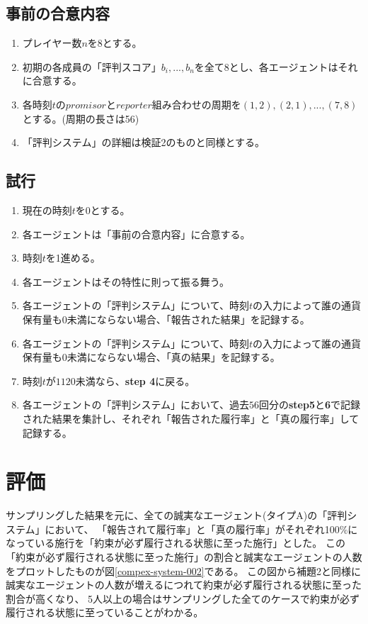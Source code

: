   \subsection{事前の合意内容}
    \begin{enumerate}
      \item プレイヤー数$n$を$8$とする。
      \item 初期の各成員の「評判スコア」${b_i, ..., b_n}$を全て$8$とし、各エージェントはそれに合意する。
      \item 各時刻$t$の$promisor$と$reporter$組み合わせの周期を$(1, 2), (2, 1), ..., (7, 8)$とする。(周期の長さは56)
      \item 「評判システム」の詳細は検証2のものと同様とする。
    \end{enumerate}

  \subsection{試行}
    \begin{enumerate}
      \item 現在の時刻$t$を$0$とする。
      \item 各エージェントは「事前の合意内容」に合意する。
      \item 時刻$t$を1進める。
      \item 各エージェントはその特性に則って振る舞う。
      \item 各エージェントの「評判システム」について、時刻$t$の入力によって誰の通貨保有量も0未満にならない場合、「報告された結果」を記録する。
      \item 各エージェントの「評判システム」について、時刻$t$の入力によって誰の通貨保有量も0未満にならない場合、「真の結果」を記録する。
      \item 時刻$t$が$1120$未満なら、\textbf{step 4}に戻る。
      \item 各エージェントの「評判システム」において、過去$56$回分の\textbf{step5}と\textbf{6}で記録された結果を集計し、それぞれ「報告された履行率」と「真の履行率」して記録する。
    \end{enumerate}

\section{評価}
サンプリングした結果を元に、全ての誠実なエージェント(タイプA)の「評判システム」において、
「報告されて履行率」と「真の履行率」がそれぞれ100\%になっている施行を「約束が必ず履行される状態に至った施行」とした。
この「約束が必ず履行される状態に至った施行」の割合と誠実なエージェントの人数をプロットしたものが図\ref{compex-system-002}である。
この図から補題2と同様に誠実なエージェントの人数が増えるにつれて約束が必ず履行される状態に至った割合が高くなり、
5人以上の場合はサンプリングした全てのケースで約束が必ず履行される状態に至っていることがわかる。

